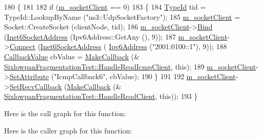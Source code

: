 \begin{DoxyCode}
180 \{
181 
182   \textcolor{keywordflow}{if} (\hyperlink{classSixlowpanFragmentationTest_a3d87ff33f33f43ba585f5772c0bdbd83}{m\_socketClient} == 0)
183     \{
184       \hyperlink{classns3_1_1TypeId}{TypeId} tid = TypeId::LookupByName (\textcolor{stringliteral}{"ns3::UdpSocketFactory"});
185       \hyperlink{classSixlowpanFragmentationTest_a3d87ff33f33f43ba585f5772c0bdbd83}{m\_socketClient} = Socket::CreateSocket (clientNode, tid);
186       \hyperlink{classSixlowpanFragmentationTest_a3d87ff33f33f43ba585f5772c0bdbd83}{m\_socketClient}->\hyperlink{classns3_1_1Socket_ada93439a43de2028b5a8fc6621dad482}{Bind} (\hyperlink{classns3_1_1Inet6SocketAddress}{Inet6SocketAddress} (Ipv6Address::GetAny (),
       9));
187       \hyperlink{classSixlowpanFragmentationTest_a3d87ff33f33f43ba585f5772c0bdbd83}{m\_socketClient}->\hyperlink{classns3_1_1Socket_a97f08aaf37b8fd7d4b5cad4dfdd4022a}{Connect} (\hyperlink{classns3_1_1Inet6SocketAddress}{Inet6SocketAddress} (
      \hyperlink{classns3_1_1Ipv6Address}{Ipv6Address} (\textcolor{stringliteral}{"2001:0100::1"}), 9));
188       \hyperlink{classns3_1_1CallbackValue}{CallbackValue} cbValue = \hyperlink{group__makecallbackmemptr_ga9376283685aa99d204048d6a4b7610a4}{MakeCallback} (&
      \hyperlink{classSixlowpanFragmentationTest_a74e986c4c910d19a1d6b16866f712c06}{SixlowpanFragmentationTest::HandleReadIcmpClient}, \textcolor{keyword}{this});
189       \hyperlink{classSixlowpanFragmentationTest_a3d87ff33f33f43ba585f5772c0bdbd83}{m\_socketClient}->\hyperlink{classns3_1_1ObjectBase_ac60245d3ea4123bbc9b1d391f1f6592f}{SetAttribute} (\textcolor{stringliteral}{"IcmpCallback6"}, cbValue);
190     \}
191 
192   \hyperlink{classSixlowpanFragmentationTest_a3d87ff33f33f43ba585f5772c0bdbd83}{m\_socketClient}->\hyperlink{classns3_1_1Socket_a243f7835ef1a85f9270fd3577e3a40da}{SetRecvCallback} (\hyperlink{group__makecallbackmemptr_ga9376283685aa99d204048d6a4b7610a4}{MakeCallback} (&
      \hyperlink{classSixlowpanFragmentationTest_aaa094eb5910c6a8b462a6c6678258713}{SixlowpanFragmentationTest::HandleReadClient}, \textcolor{keyword}{this}));
193 \}
\end{DoxyCode}


Here is the call graph for this function\+:




Here is the caller graph for this function\+:


